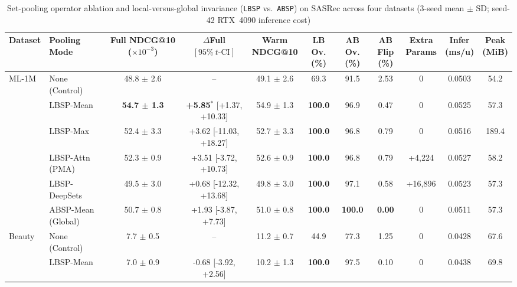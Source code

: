 \begin{table}[!htbp]
\centering
\caption{Set-pooling operator ablation and local-versus-global invariance (\texttt{LBSP} vs.\ \texttt{ABSP}) on SASRec across four datasets (3-seed mean $\pm$ SD; seed-42 RTX~4090 inference cost)}
\label{tab:pooling-ablation}
\fontsize{7.8}{9.8}\selectfont
\setlength{\tabcolsep}{2.3pt}
\renewcommand{\arraystretch}{1.10}
\noindent\begin{tabular*}{\textwidth}{@{\extracolsep{\fill}}llccccccccc@{}}
\toprule
Dataset & Pooling Mode & \shortstack{Full NDCG@10\\($\times10^{-3}$)} & \shortstack{$\Delta$Full\\$[95\%\ t\text{-CI}]$} & \shortstack{Warm\\NDCG@10} & \shortstack{LB Ov.\\(\%)} & \shortstack{AB Ov.\\(\%)} & \shortstack{AB Flip\\(\%)} & \shortstack{Extra\\Params} & \shortstack{Infer\\(ms/u)} & \shortstack{Peak\\(MiB)} \\
\midrule
ML-1M & None (Control) & 48.8 $\pm$ 2.6 & -- & 49.1 $\pm$ 2.6 & 69.3 & 91.5 & 2.53 & 0 & 0.0503 & 54.2 \\
 & LBSP-Mean & \textbf{54.7 $\pm$ 1.3} & \textbf{+5.85$^{*}$} \scriptsize{[+1.37, +10.33]} & 54.9 $\pm$ 1.3 & \textbf{100.0} & 96.9 & 0.47 & 0 & 0.0525 & 57.3 \\
 & LBSP-Max & 52.4 $\pm$ 3.3 & +3.62 \scriptsize{[-11.03, +18.27]} & 52.7 $\pm$ 3.3 & \textbf{100.0} & 96.8 & 0.79 & 0 & 0.0516 & 189.4 \\
 & LBSP-Attn (PMA) & 52.3 $\pm$ 0.9 & +3.51 \scriptsize{[-3.72, +10.73]} & 52.6 $\pm$ 0.9 & \textbf{100.0} & 96.8 & 0.79 & +4,224 & 0.0527 & 58.2 \\
 & LBSP-DeepSets & 49.5 $\pm$ 3.0 & +0.68 \scriptsize{[-12.32, +13.68]} & 49.8 $\pm$ 3.0 & \textbf{100.0} & 97.1 & 0.58 & +16,896 & 0.0523 & 57.3 \\
 & ABSP-Mean (Global) & 50.7 $\pm$ 0.8 & +1.93 \scriptsize{[-3.87, +7.73]} & 51.0 $\pm$ 0.8 & \textbf{100.0} & \textbf{100.0} & \textbf{0.00} & 0 & 0.0511 & 57.3 \\
\midrule
Beauty & None (Control) & 7.7 $\pm$ 0.5 & -- & 11.2 $\pm$ 0.7 & 44.9 & 77.3 & 1.25 & 0 & 0.0428 & 67.6 \\
 & LBSP-Mean & 7.0 $\pm$ 0.9 & -0.68 \scriptsize{[-3.92, +2.56]} & 10.2 $\pm$ 1.3 & \textbf{100.0} & 97.5 & 0.10 & 0 & 0.0438 & 69.8 \\

\end{tabular*}
\end{table}
